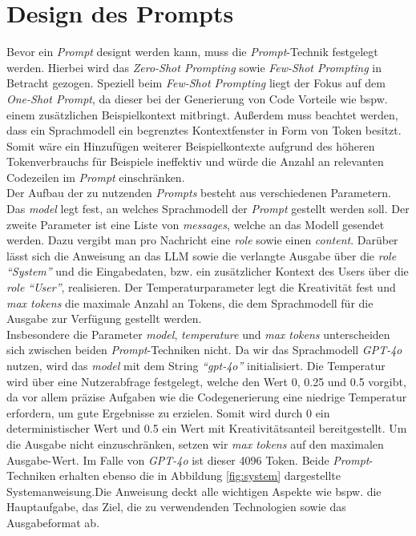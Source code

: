\section{Design des Prompts}\label{section:prompt}
Bevor ein \textit{Prompt} designt werden kann, muss die \textit{Prompt}-Technik festgelegt werden. Hierbei wird das \textit{Zero-Shot Prompting} sowie \textit{Few-Shot Prompting} in Betracht gezogen. Speziell beim \textit{Few-Shot Prompting} liegt der Fokus auf dem \textit{One-Shot Prompt}, da dieser bei der Generierung von Code Vorteile wie bspw. einem zusätzlichen Beispielkontext mitbringt. Außerdem muss beachtet werden, dass ein Sprachmodell ein begrenztes Kontextfenster in Form von Token besitzt. Somit wäre ein Hinzufügen weiterer Beispielkontexte aufgrund des höheren Tokenverbrauchs für Beispiele ineffektiv und würde die Anzahl an relevanten Codezeilen im \textit{Prompt} einschränken.\\
Der Aufbau der zu nutzenden \textit{Prompts} besteht aus verschiedenen Parametern. Das \textit{model} legt fest, an welches Sprachmodell der \textit{Prompt} gestellt werden soll. Der zweite Parameter ist eine Liste von \textit{messages}, welche an das Modell gesendet werden. Dazu vergibt man pro Nachricht eine \textit{role} sowie einen \textit{content}. Darüber lässt sich die Anweisung an das LLM sowie die verlangte Ausgabe über die \textit{role} \textit{``System''} und die Eingabedaten, bzw. ein zusätzlicher Kontext des Users über die \textit{role} \textit{``User''}, realisieren. Der Temperaturparameter legt die Kreativität fest und \textit{max tokens} die maximale Anzahl an Tokens, die dem Sprachmodell für die Ausgabe zur Verfügung gestellt werden.\\
Insbesondere die Parameter \textit{model}, \textit{temperature} und \textit{max tokens} unterscheiden sich zwischen beiden \textit{Prompt}-Techniken nicht. Da wir das Sprachmodell \textit{GPT-4o} nutzen, wird das \textit{model} mit dem String \textit{``gpt-4o''} initialisiert. Die Temperatur wird über eine Nutzerabfrage festgelegt, welche den Wert 0, 0.25 und 0.5 vorgibt, da vor allem präzise Aufgaben wie die Codegenerierung eine niedrige Temperatur erfordern, um gute Ergebnisse zu erzielen. \cite*{renzeEffectSamplingTemperature2024} Somit wird durch 0 ein deterministischer Wert und 0.5 ein Wert mit Kreativitätsanteil bereitgestellt. Um die Ausgabe nicht einzuschränken, setzen wir \textit{max tokens} auf den maximalen Ausgabe-Wert. Im Falle von \textit{GPT-4o} ist dieser 4096 Token. Beide \textit{Prompt}-Techniken erhalten ebenso die in Abbildung \ref{fig:system} dargestellte Systemanweisung.Die Anweisung deckt alle wichtigen Aspekte wie bspw. die Hauptaufgabe, das Ziel, die zu verwendenden Technologien sowie das Ausgabeformat ab. \\
